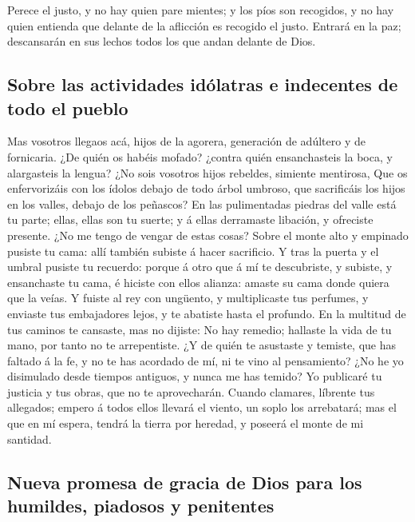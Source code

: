  Perece el justo, y no hay quien pare mientes; y los píos
son recogidos, y no hay quien entienda que delante de la aflicción es
recogido el justo.  Entrará en la paz; descansarán en sus
lechos todos los que andan delante de Dios.

\hypertarget{sobre-las-actividades-iduxf3latras-e-indecentes-de-todo-el-pueblo}{%
\subsection{Sobre las actividades idólatras e indecentes de todo el
pueblo}\label{sobre-las-actividades-iduxf3latras-e-indecentes-de-todo-el-pueblo}}

 Mas vosotros llegaos acá, hijos de la agorera, generación
de adúltero y de fornicaria.  ¿De quién os habéis mofado?
¿contra quién ensanchasteis la boca, y alargasteis la lengua? ¿No sois
vosotros hijos rebeldes, simiente mentirosa,  Que os
enfervorizáis con los ídolos debajo de todo árbol umbroso, que
sacrificáis los hijos en los valles, debajo de los peñascos?
 En las pulimentadas piedras del valle está tu parte;
ellas, ellas son tu suerte; y á ellas derramaste libación, y ofreciste
presente. ¿No me tengo de vengar de estas cosas?  Sobre el
monte alto y empinado pusiste tu cama: allí también subiste á hacer
sacrificio.  Y tras la puerta y el umbral pusiste tu
recuerdo: porque á otro que á mí te descubriste, y subiste, y
ensanchaste tu cama, é hiciste con ellos alianza: amaste su cama donde
quiera que la veías.  Y fuiste al rey con ungüento, y
multiplicaste tus perfumes, y enviaste tus embajadores lejos, y te
abatiste hasta el profundo.  En la multitud de tus
caminos te cansaste, mas no dijiste: No hay remedio; hallaste la vida de
tu mano, por tanto no te arrepentiste.  ¿Y de quién te
asustaste y temiste, que has faltado á la fe, y no te has acordado de
mí, ni te vino al pensamiento? ¿No he yo disimulado desde tiempos
antiguos, y nunca me has temido?  Yo publicaré tu
justicia y tus obras, que no te aprovecharán.  Cuando
clamares, líbrente tus allegados; empero á todos ellos llevará el
viento, un soplo los arrebatará; mas el que en mí espera, tendrá la
tierra por heredad, y poseerá el monte de mi santidad.

\hypertarget{nueva-promesa-de-gracia-de-dios-para-los-humildes-piadosos-y-penitentes}{%
\subsection{Nueva promesa de gracia de Dios para los humildes, piadosos
y
penitentes}\label{nueva-promesa-de-gracia-de-dios-para-los-humildes-piadosos-y-penitentes}}

